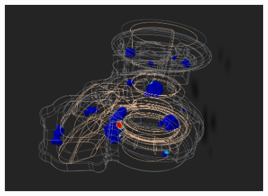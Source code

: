 \documentclass[12pt, a4]{article}
\begin{document}
\begin{figure}[!htb]
\begin{center}

    \includegraphics[scale=0.5]{simulacao1.png}
\end{center}
\end{figure}
\end{document}
